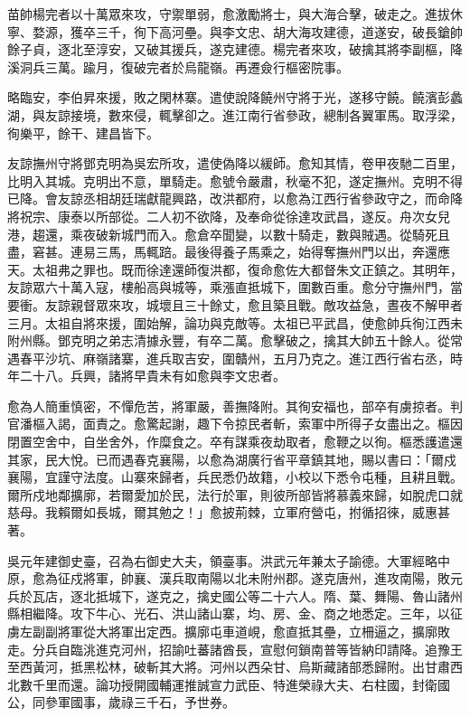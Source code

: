\begin{pinyinscope}
苗帥楊完者以十萬眾來攻，守禦單弱，愈激勵將士，與大海合擊，破走之。進拔休寧、婺源，獲卒三千，徇下高河壘。與李文忠、胡大海攻建德，道遂安，破長鎗帥餘子貞，逐北至淳安，又破其援兵，遂克建德。楊完者來攻，破擒其將李副樞，降溪洞兵三萬。踰月，復破完者於烏龍嶺。再遷僉行樞密院事。

略臨安，李伯昇來援，敗之閑林寨。遣使說降饒州守將于光，遂移守饒。饒濱彭蠡湖，與友諒接境，數來侵，輒擊卻之。進江南行省參政，總制各翼軍馬。取浮梁，徇樂平，餘干、建昌皆下。

友諒撫州守將鄧克明為吳宏所攻，遣使偽降以緩師。愈知其情，卷甲夜馳二百里，比明入其城。克明出不意，單騎走。愈號令嚴肅，秋毫不犯，遂定撫州。克明不得已降。會友諒丞相胡廷瑞獻龍興路，改洪都府，以愈為江西行省參政守之，而命降將祝宗、康泰以所部從。二人初不欲降，及奉命從徐達攻武昌，遂反。舟次女兒港，趨還，乘夜破新城門而入。愈倉卒聞變，以數十騎走，數與賊遇。從騎死且盡，窘甚。連易三馬，馬輒踣。最後得養子馬乘之，始得奪撫州門以出，奔還應天。太祖弗之罪也。既而徐達還師復洪都，復命愈佐大都督朱文正鎮之。其明年，友諒眾六十萬入寇，樓船高與城等，乘漲直抵城下，圍數百重。愈分守撫州門，當要衝。友諒親督眾來攻，城壞且三十餘丈，愈且築且戰。敵攻益急，晝夜不解甲者三月。太祖自將來援，圍始解，論功與克敵等。太祖已平武昌，使愈帥兵徇江西未附州縣。鄧克明之弟志清據永豐，有卒二萬。愈擊破之，擒其大帥五十餘人。從常遇春平沙坑、麻嶺諸寨，進兵取吉安，圍贛州，五月乃克之。進江西行省右丞，時年二十八。兵興，諸將早貴未有如愈與李文忠者。

愈為人簡重慎密，不憚危苦，將軍嚴，善撫降附。其徇安福也，部卒有虜掠者。判官潘樞入謁，面責之。愈驚起謝，趣下令掠民者斬，索軍中所得子女盡出之。樞因閉置空舍中，自坐舍外，作糜食之。卒有謀乘夜劫取者，愈鞭之以徇。樞悉護遣還其家，民大悅。已而遇春克襄陽，以愈為湖廣行省平章鎮其地，賜以書曰：「爾戍襄陽，宜謹守法度。山寨來歸者，兵民悉仍故籍，小校以下悉令屯種，且耕且戰。爾所戍地鄰擴廓，若爾愛加於民，法行於軍，則彼所部皆將慕義來歸，如脫虎口就慈母。我賴爾如長城，爾其勉之！」愈披荊棘，立軍府營屯，拊循招徠，威惠甚著。

吳元年建御史臺，召為右御史大夫，領臺事。洪武元年兼太子諭德。大軍經略中原，愈為征戍將軍，帥襄、漢兵取南陽以北未附州郡。遂克唐州，進攻南陽，敗元兵於瓦店，逐北抵城下，遂克之，擒史國公等二十六人。隋、葉、舞陽、魯山諸州縣相繼降。攻下牛心、光石、洪山諸山寨，均、房、金、商之地悉定。三年，以征虜左副副將軍從大將軍出定西。擴廓屯車道峴，愈直抵其壘，立柵逼之，擴廓敗走。分兵自臨洮進克河州，招諭吐蕃諸酋長，宣慰何鎖南普等皆納印請降。追豫王至西黃河，抵黑松林，破斬其大將。河州以西朵甘、烏斯藏諸部悉歸附。出甘肅西北數千里而還。論功授開國輔運推誠宣力武臣、特進榮祿大夫、右柱國，封衛國公，同參軍國事，歲祿三千石，予世券。


\end{pinyinscope}
